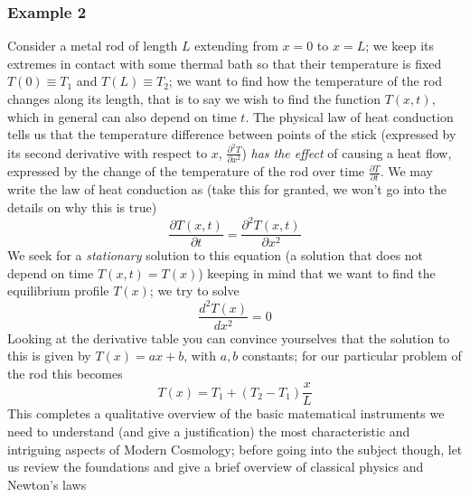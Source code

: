\subsubsection{Example 2}
Consider a metal rod of length $L$ extending from $x=0$ to $x=L$; we keep its extremes in contact with some thermal bath so that their temperature is fixed $T(0)\equiv T_1$ and $T(L)\equiv T_2$; we want to find how the temperature of the rod changes along its length, that is to say we wish to find the function $T(x,t)$, which in general can also depend on time $t$. The physical law of heat conduction tells us that the temperature difference between points of the stick (expressed by its second derivative with respect to $x$, $\frac{\partial^2 T}{\partial x^2}$) \textit{has the effect} of causing a heat flow, expressed by the change of the temperature of the rod over time $\frac{\partial T}{\partial t}$. We may write the law of heat conduction as (take this for granted, we won't go into the details on why this is true)
\begin{equation}
\frac{\partial T(x,t)}{\partial t}=\frac{\partial^2 T(x,t)}{\partial x^2}
\end{equation} 
We seek for a \textit{stationary} solution to this equation (a solution that does not depend on time $T(x,t)=T(x)$) keeping in mind that we want to find the equilibrium profile $T(x)$; we try to solve 
\begin{equation}
\frac{d^2T(x)}{dx^2}=0
\end{equation}
Looking at the derivative table you can convince yourselves that the solution to this is given by $T(x)=ax+b$, with $a,b$ constants; for our particular problem of the rod this becomes 
\begin{equation}
T(x)=T_1+(T_2-T_1)\frac{x}{L}
\end{equation}
This completes a qualitative overview of the basic matematical instruments we need to understand (and give a justification) the most characteristic and intriguing aspects of Modern Cosmology; before going into the subject though, let us review the foundations and give a brief overview of classical physics and Newton's laws 

